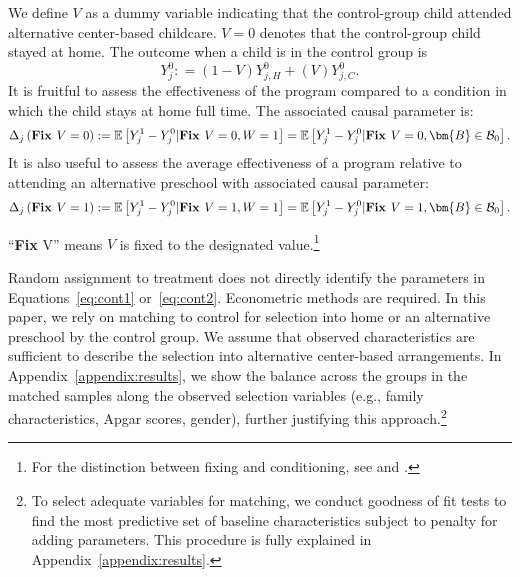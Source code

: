 We define $V$ as a dummy variable indicating that the control-group child attended alternative center-based childcare. $V=0$ denotes that the control-group child stayed at home. The outcome when a child is in the control group is
\begin{equation} 
Y_{j}^0 : = \left( 1 - V \right) Y_{j,H}^0 + \left( V \right) Y_{j,C}^0. \label{eq:meandiff}
\end{equation}
\noindent It is fruitful to assess the effectiveness of the program compared to a condition in which the child stays at home full time. The associated causal parameter is:
\begin{equation}\label{eq:cont1}
\Delta_j \left(\text{\textbf{Fix }}V = 0 \right) : =   \mathbb{E} \left[ Y_{j}^1 -  Y_{j}^0 | \text{\textbf{Fix }}V = 0, W = 1 \right] = \mathbb{E} \left[Y_{j}^1 -  Y_{j}^0 | \text{\textbf{Fix }}V = 0, \bm{B} \in \mathcal{B}_0 \right].
\end{equation}
It is also useful to assess the average effectiveness of a program relative to attending an alternative preschool with associated causal parameter:
\begin{equation}\label{eq:cont2}
\Delta_j \left( \text{\textbf{Fix }} V =1 \right) : =   \mathbb{E} \left[ Y_{j}^1 -  Y_{j}^0 | \text{\textbf{Fix }} V = 1, W = 1 \right] = \mathbb{E} \left[ Y_{j}^1 -  Y_{j}^0 | \text{\textbf{Fix }} V = 1, \bm{B} \in \mathcal{B}_0 \right].
\end{equation}

\noindent ``\textbf{Fix }V'' means $V$ is fixed to the designated value.\footnote{For the distinction between fixing and conditioning, see \citet{Haavelmo_1943_Econometrica} and \citet{Heckman_Pinto_2015_EconometTheory}.}

Random assignment to treatment does not directly identify the parameters in Equations~\eqref{eq:cont1} or~\eqref{eq:cont2}. Econometric methods are required. In this paper, we rely on matching to control for selection into home or an alternative preschool by the control group. We assume that observed characteristics are sufficient to describe the selection into alternative center-based arrangements. In Appendix~\ref{appendix:results}, we show the balance across the groups in the matched samples along the observed selection variables (e.g., family characteristics, Apgar scores, gender), further justifying this approach.\footnote{To select adequate variables for matching, we conduct goodness of fit tests to find the most predictive set of baseline characteristics subject to penalty for adding parameters. This procedure is fully explained in Appendix~\ref{appendix:results}.}

